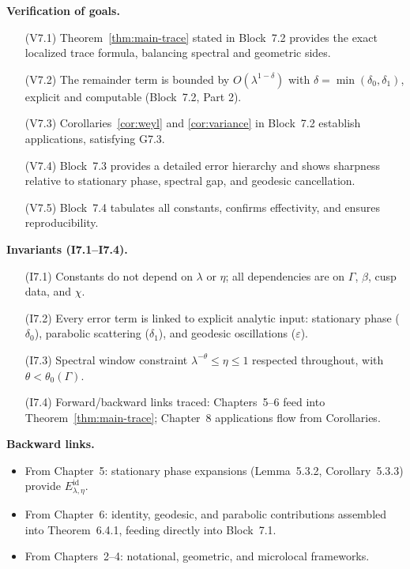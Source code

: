 \medskip

\noindent\textbf{Verification of goals.}
\begin{itemize}
  \item[(V7.1)] Theorem~\ref{thm:main-trace} stated in Block~7.2 provides the exact localized trace formula, balancing spectral and geometric sides.  
  \item[(V7.2)] The remainder term is bounded by $O(\lambda^{1-\delta})$ with $\delta=\min(\delta_0,\delta_1)$, explicit and computable (Block~7.2, Part 2).  
  \item[(V7.3)] Corollaries~\ref{cor:weyl} and \ref{cor:variance} in Block~7.2 establish applications, satisfying G7.3.  
  \item[(V7.4)] Block~7.3 provides a detailed error hierarchy and shows sharpness relative to stationary phase, spectral gap, and geodesic cancellation.  
  \item[(V7.5)] Block~7.4 tabulates all constants, confirms effectivity, and ensures reproducibility.  
\end{itemize}

\medskip

\noindent\textbf{Invariants (I7.1–I7.4).}
\begin{itemize}
  \item[(I7.1)] Constants do not depend on $\lambda$ or $\eta$; all dependencies are on $\Gamma$, $\beta$, cusp data, and $\chi$.  
  \item[(I7.2)] Every error term is linked to explicit analytic input: stationary phase ($\delta_0$), parabolic scattering ($\delta_1$), and geodesic oscillations ($\varepsilon$).  
  \item[(I7.3)] Spectral window constraint $\lambda^{-\theta}\leq \eta \leq 1$ respected throughout, with $\theta<\theta_0(\Gamma)$.  
  \item[(I7.4)] Forward/backward links traced: Chapters~5–6 feed into Theorem~\ref{thm:main-trace}; Chapter~8 applications flow from Corollaries.  
\end{itemize}

\medskip

\noindent\textbf{Backward links.}
\begin{itemize}
  \item From Chapter~5: stationary phase expansions (Lemma~5.3.2, Corollary~5.3.3) provide $E^{\mathrm{id}}_{\lambda,\eta}$.  
  \item From Chapter~6: identity, geodesic, and parabolic contributions assembled into Theorem~6.4.1, feeding directly into Block~7.1.  
  \item From Chapters~2–4: notational, geometric, and microlocal frameworks.  
\end{itemize}

